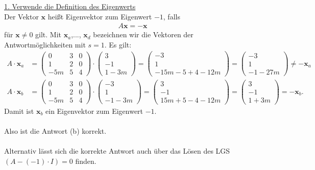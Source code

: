 \underline{1. Verwende die Definition des Eigenwerts}\\
Der Vektor $ \textbf{x} $ heißt Eigenvektor zum Eigenwert $ -1 $, falls
\begin{align*}
	A \textbf{x} = - \textbf{x}
\end{align*}
für $ \textbf{x} \neq 0 $ gilt. Mit $ \textbf{x}_a $,..., $ \textbf{x}_d $ bezeichnen wir die Vektoren der Antwortmöglichkeiten mit $ s = 1 $. 
Es gilt:
\begin{align*}
	A \cdot \textbf{x}_a
	&=
	\begin{pmatrix}
		0 & 3 & 0 \\
		1 & 2 & 0 \\
		-5m & 5 & 4
	\end{pmatrix} 
	\cdot 
	\begin{pmatrix}
		3 \\ -1 \\ 1-3m
	\end{pmatrix}
	=
	\begin{pmatrix}
		-3 \\ 1 \\ -15m - 5 +4 -12m
	\end{pmatrix}
	=
	\begin{pmatrix}
		-3 \\ 1 \\ -1 -27m
	\end{pmatrix}
	\neq - \textbf{x}_a
	\\
	A \cdot \textbf{x}_b
	&=
	\begin{pmatrix}
		0 & 3 & 0 \\
		1 & 2 & 0 \\
		-5m & 5 & 4
	\end{pmatrix} 
	\cdot 
	\begin{pmatrix}
		-3 \\ 1 \\ -1-3m
	\end{pmatrix}
	=
	\begin{pmatrix}
		3 \\ -1 \\ 15 m +5 -4 -12m
	\end{pmatrix}
	=
	\begin{pmatrix}
		3 \\ -1 \\ 1 +3m
	\end{pmatrix}
	= - \textbf{x}_b.
\end{align*} 
Damit ist $ \textbf{x}_b $ ein Eigenvektor zum Eigenwert $ -1 $.\\
\\
Also ist die Antwort (b) korrekt.\\
\\
Alternativ lässt sich die korrekte Antwort auch über das Lösen des LGS $ (A - (-1) \cdot I) = 0 $ finden.


